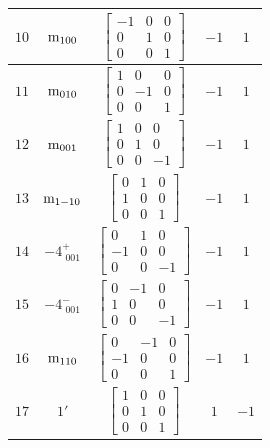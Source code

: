 \documentclass[fleqn,8pt]{jsarticle}
\begin{document}
\begin{longtable}{ccccc}
$ 10 $ & $ {\rm m}_{100} $ & $ \begin{bmatrix} -1 & 0 & 0 \\ 0 & 1 & 0 \\ 0 & 0 & 1 \end{bmatrix} $ & $ -1 $ & $ 1 $ \\ \hline
$ 11 $ & $ {\rm m}_{010} $ & $ \begin{bmatrix} 1 & 0 & 0 \\ 0 & -1 & 0 \\ 0 & 0 & 1 \end{bmatrix} $ & $ -1 $ & $ 1 $ \\ \hline
$ 12 $ & $ {\rm m}_{001} $ & $ \begin{bmatrix} 1 & 0 & 0 \\ 0 & 1 & 0 \\ 0 & 0 & -1 \end{bmatrix} $ & $ -1 $ & $ 1 $ \\ \hline
$ 13 $ & $ {\rm m}_{1-10} $ & $ \begin{bmatrix} 0 & 1 & 0 \\ 1 & 0 & 0 \\ 0 & 0 & 1 \end{bmatrix} $ & $ -1 $ & $ 1 $ \\ \hline
$ 14 $ & $ -4^{+}_{\,\,001} $ & $ \begin{bmatrix} 0 & 1 & 0 \\ -1 & 0 & 0 \\ 0 & 0 & -1 \end{bmatrix} $ & $ -1 $ & $ 1 $ \\ \hline
$ 15 $ & $ -4^{-}_{\,\,001} $ & $ \begin{bmatrix} 0 & -1 & 0 \\ 1 & 0 & 0 \\ 0 & 0 & -1 \end{bmatrix} $ & $ -1 $ & $ 1 $ \\ \hline
$ 16 $ & $ {\rm m}_{110} $ & $ \begin{bmatrix} 0 & -1 & 0 \\ -1 & 0 & 0 \\ 0 & 0 & 1 \end{bmatrix} $ & $ -1 $ & $ 1 $ \\ \hline
$ 17 $ & $ 1{}' $ & $ \begin{bmatrix} 1 & 0 & 0 \\ 0 & 1 & 0 \\ 0 & 0 & 1 \end{bmatrix} $ & $ 1 $ & $ -1 $ \\ \hline

\end{longtable}
\end{document}
